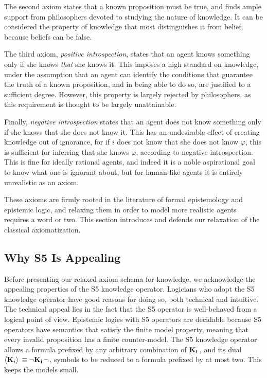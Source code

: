 The second axiom states that a known proposition must be true, and finds ample support from philosophers devoted to studying the nature of knowledge. It can be considered the property of knowledge that most distinguishes it from belief, because beliefs can be false.

The third axiom, \emph{positive introspection}, states that an agent knows something only if she knows \emph{that} she knows it. This imposes a high standard on knowledge, under the assumption that an agent can identify the conditions that guarantee the truth of a known proposition, and in being able to do so, are justified to a sufficient degree. However, this property is largely rejected by philosophers, as this requirement is thought to be largely unattainable. 

Finally, \emph{negative introspection} states that an agent does not know something only if she knows that she does not know it. This has an undesirable effect of creating knowledge out of ignorance, for if $i$ does not know that she does not know $\varphi$, this is sufficient for inferring that she knows $\varphi$, according to negative introspection. This is fine for ideally rational agents, and indeed it is a noble aspirational goal to know what one is ignorant about, but for human-like agents it is entirely unrealistic as an axiom.

These axioms are firmly rooted in the literature of formal epistemology and epistemic logic, and relaxing them in order to model more realistic agents requires a word or two. This section introduces and defends our relaxation of the classical axiomatization.

\subsection{Why S5 Is Appealing} 
Before presenting our relaxed axiom schema for knowledge, we acknowledge the appealing properties of the S5 knowledge operator. Logicians who adopt the S5 knowledge operator have good reasons for doing so, both technical and intuitive. The technical appeal lies in the fact that the S5 operator is well-behaved from a logical point of view. Epistemic logics with S5 operators are decidable because S5 operators have semantics that satisfy the finite model property, meaning that every invalid proposition has a finite counter-model. The S5 knowledge operator allows a formula prefixed by any arbitrary combination of $\mathbf{K}_{\mathbf{i}}\,$, and its dual $\langle \mathbf{K}_{i} \rangle\,\equiv{\neg}\mathbf{K}_{\mathbf{i}}\,{\neg}$, symbols to be reduced to a formula prefixed by at most two. This keeps the models small.

